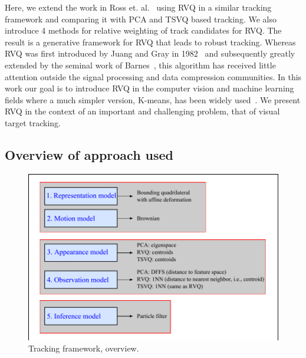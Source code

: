 Here, we extend the work in Ross et. al.~\cite{2008_JNL_subspaceTRK_Ross} using RVQ in a similar tracking framework and comparing it with PCA and TSVQ based tracking.  We also introduce 4 methods for relative weighting of track candidates for RVQ.  The result is a generative framework for RVQ that leads to robust tracking.  Whereas RVQ was first introduced by Juang and Gray in 1982~\cite{1982_CNF_SpeechRVQ_JuangGray} and subsequently greatly extended by the seminal work of Barnes~\cite{1991_CNF_DesignPerformanceRVQ_Frost,1992_JNL_RVQ_Barnes,1992_CNF_ImageCodingRVQ_Kossentini,1993_sigmaTrees_Barnes,1993_JNL_RVQDSC_Barnes,1995_JNL_OptimalityRVQ_Kossentini,1996_CNF_VQclassification_Barnes,1996_JNL_AdvancesRVQ_Barnes,2002_JNL_SigmaTrees_Barnes,2004_CNF_DSSAdataMining_Barnes,2007_JNL_Katrina_Barnes,2007_JNL_IDDM_Barnes}, this algorithm has received little attention outside the signal processing and data compression communities.  In this work our goal is to introduce RVQ in the computer vision and machine learning fields where a much simpler version, K-means, has been widely used~\cite{2008_JNL_PRML_Wu}.  We present RVQ in the context of an important and challenging problem, that of visual target tracking.

\subsection{Overview of approach used}
								\begin{figure}[t]
								\centering
								\includegraphics[width=1.0\textwidth]{thesis/PhD_experimentalOverview.pdf}
								\caption{Tracking framework, overview.}
								\label{fig:overview}
								\end{figure}

